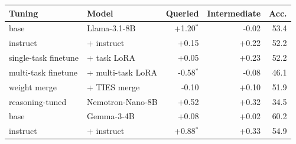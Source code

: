 \begin{tabular}{@{}llrrr@{}}
\toprule
Tuning & Model & Queried & Intermediate & Acc. \\
\midrule
base & Llama-3.1-8B & +1.20$^{*}$ & -0.02 & 53.4 \\
instruct & \quad + instruct & +0.15 & +0.22 & 52.2 \\
single-task finetune & \quad + task LoRA & +0.05 & +0.23 & 52.2 \\
multi-task finetune & \quad + multi-task LoRA & -0.58$^{*}$ & -0.08 & 46.1 \\
weight merge & \quad + TIES merge & -0.10 & +0.10 & 51.9 \\
reasoning-tuned & Nemotron-Nano-8B & +0.52 & +0.32 & 34.5 \\
\midrule
base & Gemma-3-4B & +0.08 & +0.02 & 60.2 \\
instruct & \quad + instruct & +0.88$^{*}$ & +0.33 & 54.9 \\
\bottomrule
\end{tabular}
